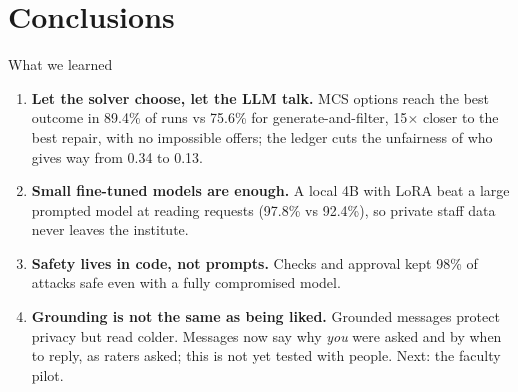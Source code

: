 \documentclass[10pt,a4paper]{article}
\begin{document}
\section{Conclusions}
\begin{bluebox}{What we learned}
\begin{enumerate}
\item \textbf{Let the solver choose, let the LLM talk.} MCS options reach the best outcome in
89.4\% of runs vs 75.6\% for generate-and-filter, 15$\times$ closer to the best repair, with no
impossible offers; the ledger cuts the unfairness of who gives way from 0.34 to 0.13.
\item \textbf{Small fine-tuned models are enough.} A local 4B with LoRA beat a large prompted
model at reading requests (97.8\% vs 92.4\%), so private staff data never leaves the institute.
\item \textbf{Safety lives in code, not prompts.} Checks and approval kept 98\% of attacks safe
even with a fully compromised model.
\item \textbf{Grounding is not the same as being liked.} Grounded messages protect privacy but
read colder. Messages now say why \emph{you} were asked and by when to reply, as raters asked; this
is not yet tested with people. Next: the faculty pilot.
\end{enumerate}
\end{bluebox}
\end{document}
